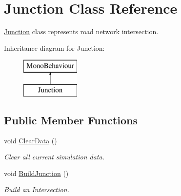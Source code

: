 \hypertarget{class_junction}{}\section{Junction Class Reference}
\label{class_junction}


\mbox{\hyperlink{class_junction}{Junction}} class represents road network intersection.  


Inheritance diagram for Junction\+:\begin{figure}[H]
\begin{center}
\leavevmode
\includegraphics[height=2.000000cm]{class_junction}
\end{center}
\end{figure}
\subsection*{Public Member Functions}
\begin{DoxyCompactItemize}
\item 
void \mbox{\hyperlink{class_junction_a57e3c911fbcf14d45b861fcce0d717aa}{Clear\+Data}} ()
\begin{DoxyCompactList}\small\item\em Clear all current simulation data. \end{DoxyCompactList}\item 
void \mbox{\hyperlink{class_junction_a8cff04b2726c9aab876bf0434cf477db}{Build\+Junction}} ()
\begin{DoxyCompactList}\small\item\em Build an Intersection. \end{DoxyCompactList}\end{DoxyCompactItemize}
